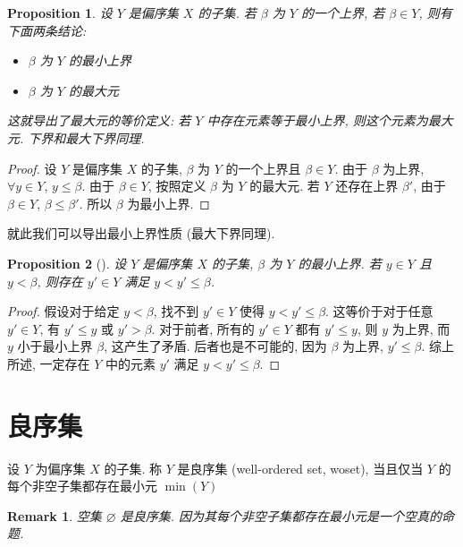 \documentclass[UTF8]{ctexart}
\theoremstyle{mystyle}
\newtheorem{proposition}{Proposition}[section]
\theoremstyle{myremark}
\newtheorem*{remark}{Remark}
\theoremstyle{plain}
\begin{document}
\begin{proposition}
    设 $ Y $ 是偏序集 $ X $ 的子集. 若 $ \beta $ 为 $ Y $ 的一个上界, 若 $ \beta \in Y $, 则有下面两条结论:
    \begin{itemize}
        \item $ \beta $ 为 $ Y $ 的最小上界
        \item $ \beta $ 为 $ Y $ 的最大元
    \end{itemize}

    这就导出了最大元的等价定义: 若 $ Y $ 中存在元素等于最小上界, 则这个元素为最大元. 下界和最大下界同理.
\end{proposition}

\begin{proof}
    设 $ Y $ 是偏序集 $ X $ 的子集, $ \beta $ 为 $ Y $ 的一个上界且 $ \beta \in Y $. 由于 $ \beta $ 为上界, $ \forall y \in Y $, $ y \le \beta $. 由于 $ \beta \in Y $, 按照定义 $ \beta $ 为 $ Y $ 的最大元. 若 $ Y $ 还存在上界 $ \beta' $, 由于 $ \beta \in Y $, $ \beta \le \beta' $. 所以 $ \beta $ 为最小上界.
\end{proof}

就此我们可以导出最小上界性质 (最大下界同理).

\begin{proposition}[]
    设 $ Y $ 是偏序集 $ X $ 的子集, $ \beta $ 为 $ Y $ 的最小上界. 若 $ y \in Y $ 且 $ y < \beta $, 则存在 $ y' \in Y $ 满足 $ y < y' \le \beta $.
\end{proposition}

\begin{proof}
    假设对于给定 $ y < \beta $, 找不到 $ y' \in Y $ 使得 $ y < y' \le \beta $. 这等价于对于任意 $ y' \in Y $, 有 $ y' \le y $ 或 $ y' > \beta $. 对于前者, 所有的 $ y' \in Y $ 都有 $ y' \le y $, 则 $ y $ 为上界, 而 $ y $ 小于最小上界 $ \beta $, 这产生了矛盾. 后者也是不可能的, 因为 $ \beta $ 为上界, $ y' \le \beta $. 综上所述, 一定存在 $ Y $ 中的元素 $ y' $ 满足 $ y < y' \le \beta $.
\end{proof}


\section{良序集}
\begin{definition}
    设 $ Y $ 为偏序集 $ X $ 的子集. 称 $ Y $ 是良序集 (well-ordered set, woset), 当且仅当 $ Y $ 的每个非空子集都存在最小元 $ \min(Y) $
\end{definition}

\begin{remark}
    空集 $ \varnothing $ 是良序集. 因为其每个非空子集都存在最小元是一个空真的命题.
\end{remark}
\end{document}
